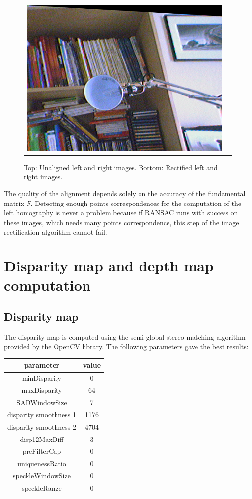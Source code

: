 \documentclass[11pt]{report}
\begin{document}
\begin{figure}[H]
\begin{tabular}{cc}
\includegraphics[scale=0.25]{images/aligned_right.png}
\end{tabular}
\caption{Top: Unaligned left and right images. Bottom: Rectified left and right images.}
\end{figure}

The quality of the alignment depends solely on the accuracy of the fundamental matrix $F$. Detecting enough points correspondences for the computation of the left homography is never a problem because if RANSAC runs with success on these images, which needs many points correspondence, this step of the image rectification algorithm cannot fail.

\section{Disparity map and depth map computation}

\subsection{Disparity map}

The disparity map is computed using the semi-global stereo matching algorithm\cite{SGBM} provided by the OpenCV library. The following parameters gave the best results:
\begin{center}
\begin{tabular}{|c|c|}
\hline
\textbf{parameter} & \textbf{value} \\
\hline
minDisparity & 0 \\
\hline
maxDisparity & 64 \\
\hline
SADWindowSize & 7 \\
\hline
disparity smoothness 1 & 1176 \\
\hline
disparity smoothness 2 & 4704 \\
\hline
disp12MaxDiff & 3 \\
\hline
preFilterCap & 0 \\
\hline
uniquenessRatio & 0 \\
\hline
speckleWindowSize & 0 \\
\hline
speckleRange & 0 \\
\hline
\end{tabular}
\end{center}
\end{document}
